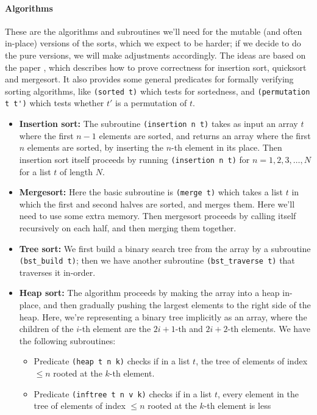 \documentclass{article}
\begin{document}
\paragraph{Algorithms}
These are the algorithms and subroutines we'll need for the mutable (and often
in-place) versions of the sorts, which we expect to be harder; if we decide to
do the pure versions, we will make adjustments accordingly. The ideas are based
on the paper \cite{filliatre1999certification}, which describes how to prove
correctness for insertion sort, quicksort and mergesort. It also provides some
general predicates for formally verifying sorting algorithms, like
\verb|(sorted t)| which tests for sortedness, and \verb|(permutation t t')|
which tests whether $t'$ is a permutation of $t$.
\begin{itemize}
  \item
\textbf{Insertion sort:} The subroutine \verb|(insertion n t)| takes as input
an array $t$ where the first $n-1$ elements are sorted, and returns an array
where the first $n$ elements are sorted, by inserting the $n$-th element in its
place. Then insertion sort itself proceeds by running \verb|(insertion n t)|
for $n=1,2,3,\ldots,N$ for a list $t$ of length $N$.
  \item
\textbf{Mergesort:} Here the basic subroutine is \verb|(merge t)| which takes a
list $t$ in which the first and second halves are sorted, and merges them. Here
we'll need to use some extra memory. Then mergesort proceeds by calling itself
recursively on each half, and then merging them together.
  \item
\textbf{Tree sort:} We first build a binary search tree from the array by a
subroutine \verb|(bst_build t)|; then we have another subroutine
\verb|(bst_traverse t)| that traverses it in-order.
  \item
\textbf{Heap sort:} The algorithm proceeds by making the array into a heap
in-place, and then gradually pushing the largest elements to the right side of
the heap. Here, we're representing a binary tree implicitly as an array, where
the children of the $i$-th element are the $2i+1$-th and $2i+2$-th elements. We
have the following subroutines:
  \begin{itemize}
  \item
Predicate \verb|(heap t n k)| checks if in a list $t$, the tree of elements of
index $\leq n$ rooted at the $k$-th element.
  \item
Predicate \verb|(inftree t n v k)| checks if in a list $t$, every element in
the tree of elements of index $\leq n$ rooted at the $k$-th element is less

\end{itemize}
\end{itemize}
\end{document}
